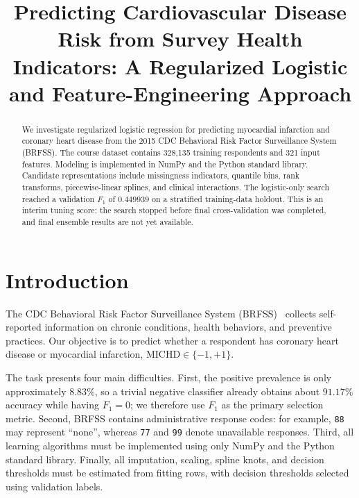 \documentclass[10pt,conference,compsocconf]{IEEEtran}
\begin{document}
\title{Predicting Cardiovascular Disease Risk from Survey Health Indicators:
A Regularized Logistic and Feature-Engineering Approach}

\author{
}

\maketitle

\begin{abstract}
We investigate regularized logistic regression for predicting myocardial
infarction and coronary heart disease from the 2015 CDC Behavioral Risk Factor
Surveillance System (BRFSS). The course dataset contains 328,135 training
respondents and 321 input features. Modeling is implemented in NumPy and the
Python standard library. Candidate representations include missingness
indicators, quantile bins, rank transforms, piecewise-linear splines, and
clinical interactions. The logistic-only search reached a validation $F_1$ of
$0.449939$ on a stratified training-data holdout. This is an interim tuning
score: the search stopped before final cross-validation was completed, and
final ensemble results are not yet available.
\end{abstract}

\section{Introduction}

The CDC Behavioral Risk Factor Surveillance System (BRFSS)~\cite{cdc2015} collects
self-reported information on chronic conditions, health behaviors, and
preventive practices. Our objective is to predict whether a respondent has
coronary heart disease or myocardial infarction,
$\text{MICHD}\in\{-1,+1\}$.

The task presents four main difficulties. First, the positive prevalence is
only approximately $8.83\%$, so a trivial negative classifier already obtains
about $91.17\%$ accuracy while having $F_1=0$; we therefore use $F_1$ as the
primary selection metric. Second, BRFSS contains administrative response codes:
for example, \texttt{88} may represent ``none'', whereas \texttt{77} and
\texttt{99} denote unavailable responses. Third, all learning algorithms must
be implemented using only NumPy and the Python standard library. Finally, all
imputation, scaling, spline knots, and decision thresholds must be estimated
from fitting rows, with decision thresholds selected using validation labels.
\end{document}
